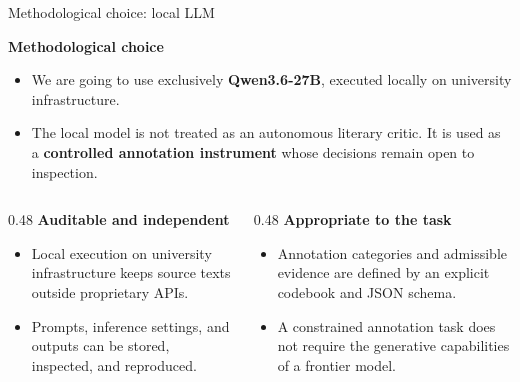 \documentclass{beamer}
\newcommand{\imp}[1]{\textbf{\color{cyan}#1}}
\newcommand{\de}[1]{\textbf{\color{red}#1}}
\begin{document}
  	
  	\begin{frame}{Methodological choice: local LLM}
  		
  		\scriptsize
  		
  		\begin{block}{\de{Methodological choice}}
  			\begin{itemize}
  				\item We are going to use exclusively \imp{Qwen3.6-27B}, executed locally on university infrastructure. 
  				\item The local model is not treated as an autonomous literary critic.
  				It is used as a \imp{controlled annotation instrument} whose
  				decisions remain open to inspection.
  			\end{itemize}
  		\end{block}
  		\vspace*{0.3cm}
  		\begin{columns}[T,onlytextwidth]
  			\begin{column}{0.48\textwidth}
  				\textbf{Auditable and independent}
  				\begin{itemize}
  					\item Local execution on university infrastructure keeps source
  					texts outside proprietary APIs.
  					\item Prompts, inference settings, and outputs can be stored,
  					inspected, and reproduced.
  				\end{itemize}
  			\end{column}
  			\begin{column}{0.48\textwidth}
  				\textbf{Appropriate to the task}
  				\begin{itemize}
  					\item Annotation categories and admissible evidence are defined
  					by an explicit codebook and JSON schema.
  					\item A constrained annotation task does not require the
  					generative capabilities of a frontier model.
  				\end{itemize}
  			\end{column}
  		\end{columns}
  		
  		\vfill
  		
  	\end{frame}
  	
  	
\end{document}
